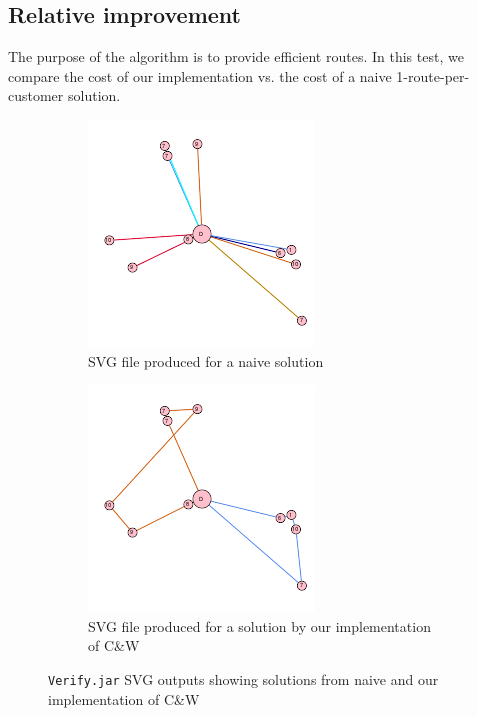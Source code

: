 \documentclass[a4paper]{article}
\begin{document}
        \subsection{Relative improvement}
        The purpose of the algorithm is to provide efficient routes. In this test, we compare the cost of our implementation vs. the cost of a naive
        1-route-per-customer solution.
        
        \begin{figure}[h]
            \centering
            \begin{subfigure}{.5\textwidth}
                \centering
                \includegraphics[width=.4\linewidth]{images/10-customers-naive.png}
                \caption{SVG file produced for a naive solution}
                \label{fig:sub1}
            \end{subfigure}%
            \begin{subfigure}{.5\textwidth}
                \centering
                \includegraphics[width=.4\linewidth]{images/10-customers-routed.png}
                \caption{SVG file produced for a solution by our implementation of C\&W}
                \label{fig:sub1}
            \end{subfigure}
            \caption{\texttt{Verify.jar} SVG outputs showing solutions from naive and our implementation of C\&W}
            \label{fig:speedandefficiency}
        \end{figure}
        
\end{document}
